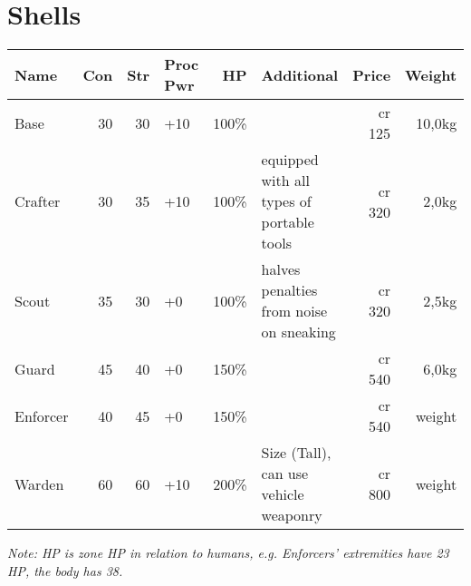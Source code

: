 \documentclass[12pt,a4paper,openany]{book}
\begin{document}
	\section{Shells}
	\begin{tabularx}{\textwidth}{|l|r|r|l|r|X|r|r|}
		\hline
		Name & Con & Str & Proc Pwr & HP & Additional & Price & Weight \\ \hline
		Base & 30 & 30 & +10 & 100\% & & cr 125 & 10,0kg \\ \hline
		Crafter & 30 & 35 & +10 & 100\% & equipped with all types of portable tools & cr 320 & 2,0kg \\ \hline
		Scout & 35 & 30 & +0 & 100\% & halves penalties from noise on sneaking & cr 320 & 2,5kg \\ \hline
		Guard & 45 & 40 & +0 & 150\% & & cr 540 & 6,0kg \\ \hline
		Enforcer & 40 & 45 & +0 & 150\% & & cr 540 & weight \\ \hline
		Warden & 60 & 60 & +10 & 200\% & Size (Tall), can use vehicle weaponry & cr 800 & weight \\ \hline
	\end{tabularx}
	\textit{Note: HP is zone HP in relation to humans, e.g. Enforcers' extremities have 23 HP, the body has 38.}
\end{document}
